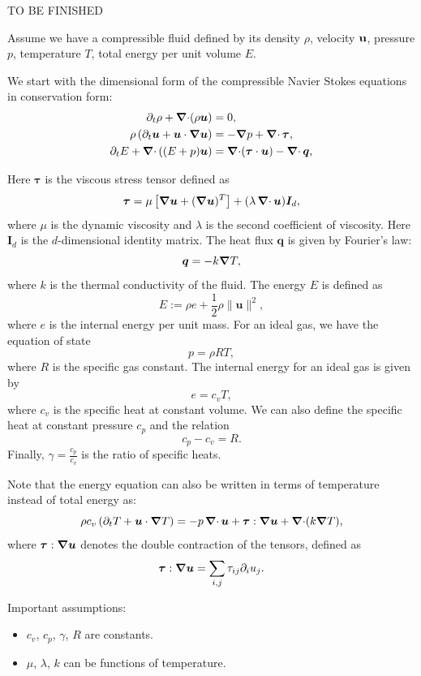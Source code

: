 \documentclass{article}
\begin{document}
TO BE FINISHED


Assume we have a compressible fluid defined by its density $\rho$, velocity $\bf{u}$, pressure $p$, temperature $T$, total energy per unit volume $E$.

We start with the dimensional form of the compressible Navier Stokes equations in conservation form:
\begin{align*}
	\partial_t \rho + \operatorname{\boldsymbol{\mathrm{\nabla}}\cdot} (\rho \bm{u})                         & = 0,                                             \\
	\rho\left(\partial_t \bm{u} + \bm{u}\cdot \grad \bm{u}\right) & = - \grad p + \operatorname{\boldsymbol{\mathrm{\nabla}}\cdot} \bm{\tau},                   \\
	\partial_t E + \operatorname{\boldsymbol{\mathrm{\nabla}}\cdot} \left( (E + p) \bm{u} \right)            & = \operatorname{\boldsymbol{\mathrm{\nabla}}\cdot} (\bm{\tau} \cdot \bm{u}) - \operatorname{\boldsymbol{\mathrm{\nabla}}\cdot} \bm{q},
\end{align*}

Here $\bm{\tau}$ is the viscous stress tensor defined as
\[\bm{\tau} = \mu \left[ \grad \bm{u} + (\grad \bm{u})^T\right] + (\lambda \operatorname{\boldsymbol{\mathrm{\nabla}}\cdot} \bm{u}) \bm{I}_d,\]
where $\mu$ is the dynamic viscosity and $\lambda$ is the second coefficient of viscosity. Here $\bm{I}_d$ is the $d$-dimensional identity matrix. The heat flux $\bm{q}$ is given by Fourier's law:
\[\bm{q} = - k \grad T,\]
where $k$ is the thermal conductivity of the fluid. The energy $E$ is defined as
\[E := \rho e + \frac{1}{2} \rho \|\bm{u}\|^2,\]
where $e$ is the internal energy per unit mass. For an ideal gas, we have the equation of state
\[p = \rho R T,\]
where $R$ is the specific gas constant. The internal energy for an ideal gas is given by
\[e = c_v T,\]
where $c_v$ is the specific heat at constant volume. We can also define the specific heat at constant pressure $c_p$ and the relation
\[c_p - c_v = R.\]
Finally, $\gamma = \frac{c_p}{c_v}$ is the ratio of specific heats.

Note that the energy equation can also be written in terms of temperature instead of total energy as:
\[\rho c_v \left(\partial_t T + \bm{u} \cdot \grad T\right)= - p \operatorname{\boldsymbol{\mathrm{\nabla}}\cdot} \bm{u} + \bm{\tau} : \grad \bm{u} + \operatorname{\boldsymbol{\mathrm{\nabla}}\cdot} (k \grad T),\]
where $\bm{\tau} : \grad \bm{u}$ denotes the double contraction of the tensors, defined as
\[\bm{\tau} : \grad \bm{u} = \sum_{i,j} \tau_{ij} \partial_i u_j.\]

Important assumptions:
\begin{itemize}
	\item $c_v$, $c_p$, $\gamma$, $R$ are constants.
	\item $\mu$, $\lambda$, $k$ can be functions of temperature.
\end{itemize}
\end{document}
